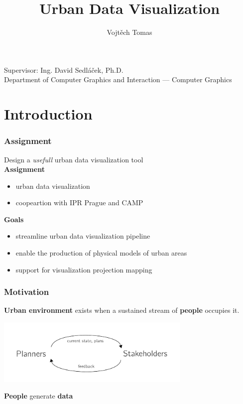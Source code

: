 \documentclass[czech,xcolor={table}]{beamer}
\title{Urban Data Visualization}
\author{Vojtěch Tomas}
\date{}
\begin{document}
	\begin{frame}
		\titlepage
		\begin{center}
		Supervisor: Ing. David Sedláček, Ph.D. \\\vspace{1em}
		\small Department of Computer Graphics and Interaction  --- Computer Graphics
		\end{center}
	\end{frame}

	\section{Introduction}
	\begin{frame}
		\frametitle{Assignment}
		{
			\centering
			Design a \textit{usefull} urban data visualization tool\\\vspace{1em}
		}
		\textbf{Assignment}
		\begin{itemize}
			\item urban data visualization 
			\item coopeartion with IPR Prague and CAMP
		\end{itemize}
		\textbf{Goals}
		\begin{itemize}
			\item streamline urban data visualization pipeline
			\item enable the production of physical models of urban areas
			\item support for visualization projection mapping
		\end{itemize}
	\end{frame}


	\begin{frame}
		\frametitle{Motivation}
		{
			\begin{center}
				\textbf{Urban environment} exists when a sustained stream of \textbf{people} occupies it. 
			\end{center}
		}
		\begin{center}
			\includegraphics[width=0.7\textwidth]{imgs/Loop1.pdf}
		\end{center}
		{
			\begin{center}
				\textbf{People} generate \textbf{data}
			\end{center}
		}
	\end{frame}
\end{document}
